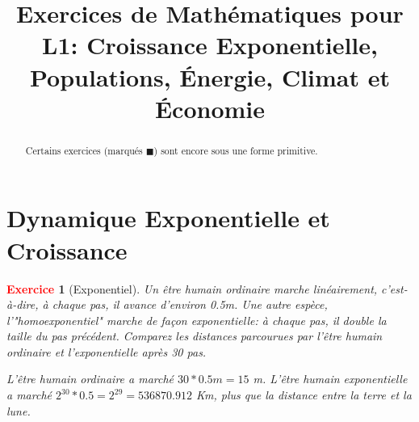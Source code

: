 \documentclass[11pt]{article}
\theoremstyle{mythmstyle}
\newtheorem{exo}{\textcolor{red}{\textbf{Exercice}}}
\begin{document}
\title{Exercices de Mathématiques pour L1: 
Croissance Exponentielle, Populations, Énergie, Climat et Économie}

\maketitle

\begin{abstract}
Certains exercices (marqués $\blacksquare$) sont encore sous une forme primitive.
\end{abstract}

\tableofcontents

\section{Dynamique Exponentielle et Croissance}


\begin{exo}[Exponentiel]
Un être humain ordinaire marche linéairement, c'est-à-dire, à chaque pas, il avance d'environ 0.5m. Une autre espèce, l'"homoexponentiel" marche de façon exponentielle: à chaque pas, il double la taille du pas précédent. 
Comparez les distances parcourues par l'être humain ordinaire et l'exponentielle après 30 pas.


\medskip
\begin{solution}
L'être humain ordinaire a marché $30*0.5m=15$ m. L'être humain exponentielle a marché $2^{30}*0.5=2^{29}= 536870.912$ Km, plus que la distance  entre la terre et la lune.
\end{solution}

\end{exo}

\vspace{1cm}
\end{document}
